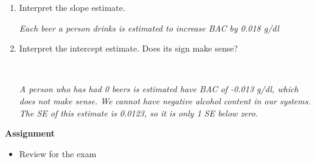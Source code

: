 \begin{enumerate}
\begin{enumerate}
\begin{enumerate}
\begin{key}
  {\it  0.041}
\end{key}
   \item  The eight beer drinker had observed BAC of 0.126. Compute
     that residual as well and explain why one residual is negative
     and the other positive.
\begin{students}
 \vspace{2cm}\\
\end{students}

\begin{key}
  {\it  -0.005. This one is negative because it's below the line. The
    9 beers person's point is above the line, so it has a positive residual.}
\end{key}

\end{enumerate}
\item Interpret the slope estimate. 
\begin{students}
 \vspace{2cm}
\end{students}

\begin{key}
  {\it Each beer a person drinks is estimated to increase BAC by 0.018 g/dl}
\end{key}

\item Interpret the intercept estimate. Does its sign make sense?
\begin{students}
 \vspace{2cm}\\
\end{students}

\begin{key}
  {\it A person who has had 0 beers is estimated have BAC of -0.013
    g/dl, which does not make sense. We cannot have negative alcohol
    content in our systems. The SE of this estimate is 0.0123, so it
    is only 1 SE below zero.}
\end{key}
\end{enumerate}\vspace*{\fill}




\end{enumerate}
 



\noindent
{\bf Assignment} \vspace{-.2in}
\begin{itemize}
\item Review for the exam
\end{itemize}


